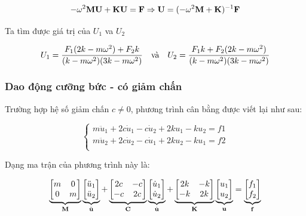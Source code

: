 \begin{equation}
    -\omega^2{\bf M}{\bf U} + {\bf K}{\bf U} = {\bf F} \Rightarrow {\bf U} = (-\omega^2{\bf M}+{\bf K})^{-1} {\bf F}
\end{equation}

Ta tìm được giá trị của $U_1$ va $U_2$

\begin{equation}
    U_1 = \frac{F_1(2k-m\omega^2)+F_2k}{(k-m\omega^2)(3k-m\omega^2)} \quad \hbox{và} \quad U_2 = \frac{F_1k+F_2(2k-m\omega^2)}{(k-m\omega^2)(3k-m\omega^2)}
\end{equation}

\subsubsection{Dao động cưỡng bức - có giảm chấn}

Trường hợp hệ số giảm chấn  $c \neq 0$, phương trình cân bằng được viết lại như sau:

\begin{equation}\label{eq_PT2dofs_c}
    \begin{cases}
        m \ddot{u}_1 + 2c\dot{u}_1 - c\dot{u}_2 + 2ku_1 - ku_2 = f1 \\
        m \ddot{u}_2 + 2c\dot{u}_2 - c\dot{u}_1 + 2ku_2 - ku_1 = f2 \\
    \end{cases}
\end{equation}

Dạng ma trận của phương trình này là:

\begin{equation}\label{eq_PT2dofs_c_matrix}
    \underbrace{\begin{bmatrix}
        m & 0\\ 0 & m
    \end{bmatrix}}_{\bf M}\underbrace{\begin{bmatrix}
        \ddot{u}_1 \\ \ddot{u}_2
    \end{bmatrix}}_{\ddot{\bf u}} + \underbrace{\begin{bmatrix}
        2c & -c \\ -c & 2c
    \end{bmatrix}}_{\bf C}\underbrace{\begin{bmatrix}
        \dot{u}_1 \\ \dot{u}_2
    \end{bmatrix}}_{\dot{\bf u}} +\underbrace{\begin{bmatrix}
        2k & -k \\ -k & 2k
    \end{bmatrix}}_{\bf K} \underbrace{\begin{bmatrix}
        u_1 \\ u_2
    \end{bmatrix}}_{\bf u} = \underbrace{\begin{bmatrix}
        f_1 \\ f_2
    \end{bmatrix}}_{\bf f} 
\end{equation}


